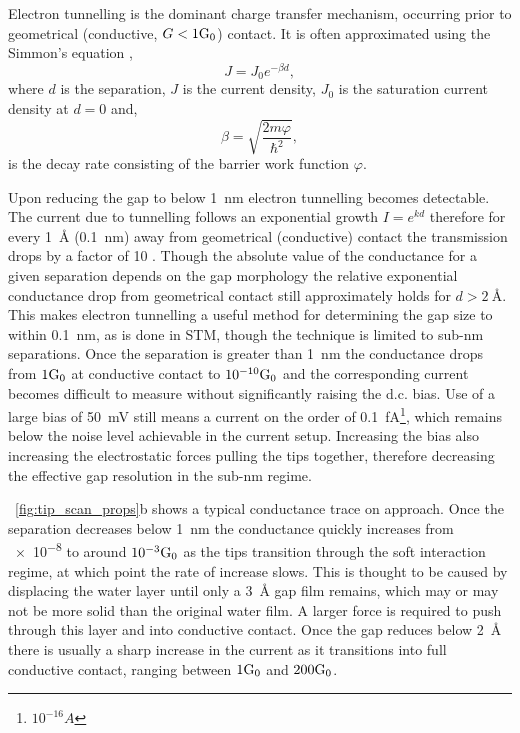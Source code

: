 \documentclass{book}
\begin{document}
Electron tunnelling is the dominant charge transfer mechanism, occurring prior to geometrical (conductive, $G<1\mathrm{G_{0}}$) contact. It is often approximated using the Simmon's equation \cite{tan2014},
\begin{equation} J=J_0e^{-\beta d}, \end{equation}
where $d$ is the separation, $J$ is the current density, $J_0$ is the saturation current density at $d=0$ and,
\begin{equation} \beta = \sqrt{\frac{2m\varphi}{\hbar^2}}, \end{equation}
is the decay rate consisting of the barrier work function $\varphi$.

Upon reducing the gap to below \SI{1}{nm} electron tunnelling becomes detectable. The current due to tunnelling follows an exponential growth $I = e^{kd}$ therefore for every \SI{1}{\angstrom} (\SI{0.1}{nm}) away from geometrical (conductive) contact the transmission drops by a factor of 10 \cite{}. Though the absolute value of the conductance for a given separation depends on the gap morphology the relative exponential conductance drop from geometrical contact still approximately holds for $d>\SI{2}{\angstrom} $\cite{esteban2014classical}. This makes electron tunnelling a useful method for determining the gap size to within \SI{0.1}{nm}, as is done in STM, though the technique is limited to sub-nm separations. Once the separation is greater than \SI{1}{nm} the conductance drops from $1\mathrm{G_{0}}$ at conductive contact to $10^{-10}\mathrm{G_{0}}$ and the corresponding current becomes difficult to measure without significantly raising the d.c. bias. Use of a large bias of \SI{50}{mV} still means a current on the order of \SI{0.1}{fA}\footnote{$10^{-16}\si{A}$}, which remains below the noise level achievable in the current setup. Increasing the bias also increasing the electrostatic forces pulling the tips together, therefore decreasing the effective gap resolution in the sub-nm regime.

\figurename~\ref{fig:tip_scan_props}b shows a typical conductance trace on approach. Once the separation decreases below \SI{1}{nm} the conductance quickly increases from \num{e-8} to around $10^{-3}\mathrm{G_{0}}$ as the tips transition through the soft interaction regime, at which point the rate of increase slows. {\color{red}This is thought to be caused by displacing the water layer until only a \SI{3}{\angstrom} gap film remains, which may or may not be more solid than the original water film.} A larger force is required to push through this layer and into conductive contact. Once the gap reduces below \SI{2}{\angstrom} there is usually a sharp increase in the current as it transitions into full conductive contact, ranging between $1\mathrm{G_{0}}$ and $200\mathrm{G_{0}}$.
\end{document}
